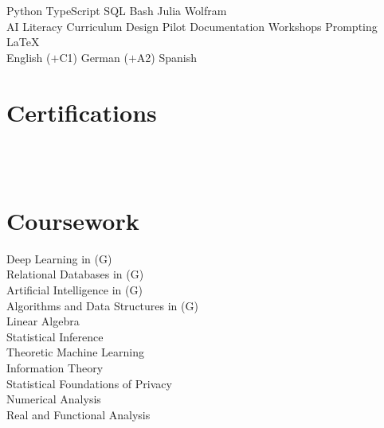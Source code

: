 \documentclass{tex/deedy-resume-openfont}
\begin{document}
\begin{minipage}[t]{0.32\textwidth}
Python \textbullet{} 
TypeScript \textbullet{} 
SQL \textbullet{} 
Bash \textbullet{} 
Julia \textbullet{} 
Wolfram \\[4pt]

AI Literacy \textbullet{} 
Curriculum Design \textbullet{} 
Pilot Documentation \textbullet{} 
Workshops \textbullet{} 
Prompting \textbullet{} 
\LaTeX{}\\[4pt]

English ($+$C1) \textbullet{} German ($+$A2) \textbullet{} Spanish\\[4pt]


\section{Certifications}
\href{https://www.credly.com/users/danivpv}{}\\
\href{https://www.credly.com/users/danivpv}{}\\[4pt]


\section{Coursework}
Deep Learning in (G)\\
Relational Databases in  (G)\\
Artificial Intelligence in  (G)\\
Algorithms and Data Structures in  (G)\\
Linear Algebra\\[4pt]

Statistical Inference\\
Theoretic Machine Learning\\
Information Theory\\
Statistical Foundations of Privacy\\
Numerical Analysis \\
Real and Functional Analysis


%
%

\end{minipage} 
\end{document}
